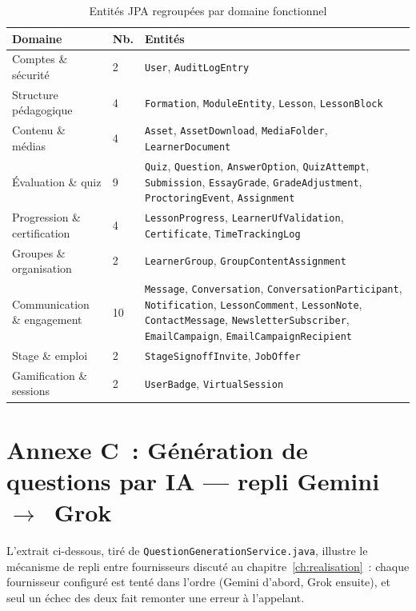 \documentclass[12pt,a4paper,oneside]{report}
\begin{document}
\begin{table}[H]
  \centering
  \small
  \caption{Entités JPA regroupées par domaine fonctionnel}
  \label{tab:entites-domaines}
  \begin{tabular}{|p{4.2cm}|p{0.9cm}|p{8.4cm}|}
    \toprule
    Domaine & Nb. & Entités \\
    \midrule
    Comptes \& sécurité & 2 & \texttt{User}, \texttt{AuditLogEntry} \\ \hline
    Structure pédagogique & 4 & \texttt{Formation}, \texttt{ModuleEntity}, \texttt{Lesson}, \texttt{LessonBlock} \\ \hline
    Contenu \& médias & 4 & \texttt{Asset}, \texttt{AssetDownload}, \texttt{MediaFolder}, \texttt{LearnerDocument} \\ \hline
    Évaluation \& quiz & 9 & \texttt{Quiz}, \texttt{Question}, \texttt{AnswerOption}, \texttt{QuizAttempt}, \texttt{Submission}, \texttt{EssayGrade}, \texttt{GradeAdjustment}, \texttt{ProctoringEvent}, \texttt{Assignment} \\ \hline
    Progression \& certification & 4 & \texttt{LessonProgress}, \texttt{LearnerUfValidation}, \texttt{Certificate}, \texttt{TimeTrackingLog} \\ \hline
    Groupes \& organisation & 2 & \texttt{LearnerGroup}, \texttt{GroupContentAssignment} \\ \hline
    Communication \& engagement & 10 & \texttt{Message}, \texttt{Conversation}, \texttt{ConversationParticipant}, \texttt{Notification}, \texttt{LessonComment}, \texttt{LessonNote}, \texttt{ContactMessage}, \texttt{NewsletterSubscriber}, \texttt{EmailCampaign}, \texttt{EmailCampaignRecipient} \\ \hline
    Stage \& emploi & 2 & \texttt{StageSignoffInvite}, \texttt{JobOffer} \\ \hline
    Gamification \& sessions & 2 & \texttt{UserBadge}, \texttt{VirtualSession} \\
    \bottomrule
  \end{tabular}
\end{table}

\section{Annexe C~: Génération de questions par IA --- repli Gemini~$\rightarrow$~Grok}

L'extrait ci-dessous, tiré de \texttt{QuestionGenerationService.java},
illustre le mécanisme de repli entre fournisseurs discuté au
chapitre~\ref{ch:realisation}~: chaque fournisseur configuré est tenté
dans l'ordre (Gemini d'abord, Grok ensuite), et seul un échec des deux
fait remonter une erreur à l'appelant.
\end{document}
